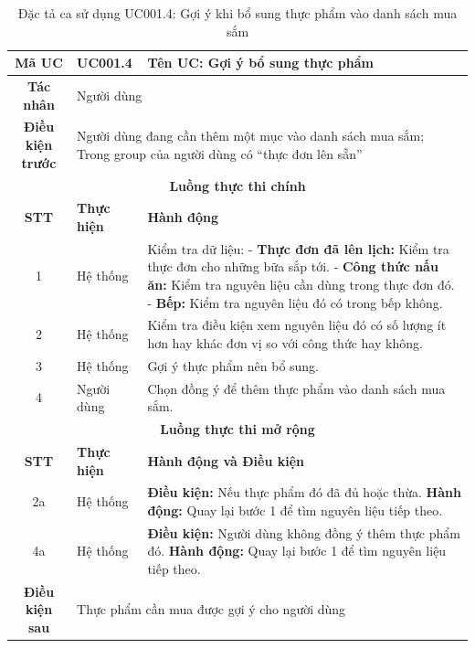 \begin{table}[H]
    \centering
    \label{tab:uc001-4}
    \begin{tabularx}{\textwidth}{|c|p{3.5cm}|X|}
        \hline
        \rowcolor{headergreen} 
        \textbf{Mã UC} & \textbf{UC001.4} & \textbf{Tên UC: Gợi ý bổ sung thực phẩm} \\ \hline
        \textbf{Tác nhân} & \multicolumn{2}{l|}{Người dùng} \\ \hline
        \textbf{Điều kiện trước} & \multicolumn{2}{X|}{Người dùng đang cần thêm một mục vào danh sách mua sắm; Trong group của người dùng có ``thực đơn lên sẵn''} \\ \hline
        
        \multicolumn{3}{|c|}{\cellcolor{headerorange}\textbf{Luồng thực thi chính}} \\ \hline
        \rowcolor{graybg} \textbf{STT} & \textbf{Thực hiện} & \textbf{Hành động} \\ \hline
        1 & Hệ thống & Kiểm tra dữ liệu: \newline
        - \textbf{Thực đơn đã lên lịch:} Kiểm tra thực đơn cho những bữa sắp tới. \newline
        - \textbf{Công thức nấu ăn:} Kiểm tra nguyên liệu cần dùng trong thực đơn đó. \newline
        - \textbf{Bếp:} Kiểm tra nguyên liệu đó có trong bếp không. \\ \hline
        2 & Hệ thống & Kiểm tra điều kiện xem nguyên liệu đó có số lượng ít hơn hay khác đơn vị so với công thức hay không. \\ \hline
        3 & Hệ thống & Gợi ý thực phẩm nên bổ sung. \\ \hline
        4 & Người dùng & Chọn đồng ý để thêm thực phẩm vào danh sách mua sắm. \\ \hline
        
        \multicolumn{3}{|c|}{\cellcolor{headerorange}\textbf{Luồng thực thi mở rộng}} \\ \hline
        \rowcolor{graybg} \textbf{STT} & \textbf{Thực hiện} & \textbf{Hành động và Điều kiện} \\ \hline
        2a & Hệ thống & \textbf{Điều kiện:} Nếu thực phẩm đó đã đủ hoặc thừa. \newline
        \textbf{Hành động:} Quay lại bước 1 để tìm nguyên liệu tiếp theo. \\ \hline
        4a & Hệ thống & \textbf{Điều kiện:} Người dùng không đồng ý thêm thực phẩm đó. \newline
        \textbf{Hành động:} Quay lại bước 1 để tìm nguyên liệu tiếp theo. \\ \hline
        
        \textbf{Điều kiện sau} & \multicolumn{2}{X|}{Thực phẩm cần mua được gợi ý cho người dùng} \\ \hline
    \end{tabularx}
    \caption{Đặc tả ca sử dụng UC001.4: Gợi ý khi bổ sung thực phẩm vào danh sách mua sắm}
\end{table}
